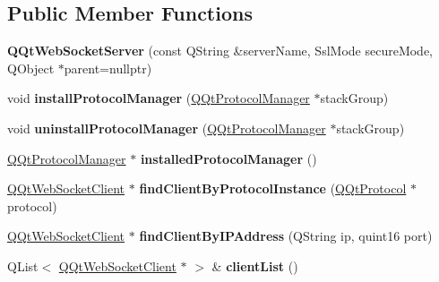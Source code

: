 \subsection*{Public Member Functions}
\begin{DoxyCompactItemize}
\item 
\mbox{\label{class_q_qt_web_socket_server_a0391df0c964c0d264d536e7ae264fb32}} 
{\bfseries Q\+Qt\+Web\+Socket\+Server} (const Q\+String \&server\+Name, Ssl\+Mode secure\+Mode, Q\+Object $\ast$parent=nullptr)
\item 
\mbox{\label{class_q_qt_web_socket_server_a0d2e4f86f7b1cf2313f58ba5808126ea}} 
void {\bfseries install\+Protocol\+Manager} (\mbox{\hyperlink{class_q_qt_protocol_manager}{Q\+Qt\+Protocol\+Manager}} $\ast$stack\+Group)
\item 
\mbox{\label{class_q_qt_web_socket_server_a564df88d2914ae93a5bb6ecc49660790}} 
void {\bfseries uninstall\+Protocol\+Manager} (\mbox{\hyperlink{class_q_qt_protocol_manager}{Q\+Qt\+Protocol\+Manager}} $\ast$stack\+Group)
\item 
\mbox{\label{class_q_qt_web_socket_server_afef44a31a32ba2fa57be3bd77121ac9d}} 
\mbox{\hyperlink{class_q_qt_protocol_manager}{Q\+Qt\+Protocol\+Manager}} $\ast$ {\bfseries installed\+Protocol\+Manager} ()
\item 
\mbox{\label{class_q_qt_web_socket_server_a5570f6e6c5163622dfb85e12063f4e8e}} 
\mbox{\hyperlink{class_q_qt_web_socket_client}{Q\+Qt\+Web\+Socket\+Client}} $\ast$ {\bfseries find\+Client\+By\+Protocol\+Instance} (\mbox{\hyperlink{class_q_qt_protocol}{Q\+Qt\+Protocol}} $\ast$protocol)
\item 
\mbox{\label{class_q_qt_web_socket_server_ae2e2fa2005890802200425bb5275b1f9}} 
\mbox{\hyperlink{class_q_qt_web_socket_client}{Q\+Qt\+Web\+Socket\+Client}} $\ast$ {\bfseries find\+Client\+By\+I\+P\+Address} (Q\+String ip, quint16 port)
\item 
\mbox{\label{class_q_qt_web_socket_server_a4112b576c4258c4360c6a0a44ef31a70}} 
Q\+List$<$ \mbox{\hyperlink{class_q_qt_web_socket_client}{Q\+Qt\+Web\+Socket\+Client}} $\ast$ $>$ \& {\bfseries client\+List} ()
\end{DoxyCompactItemize}


